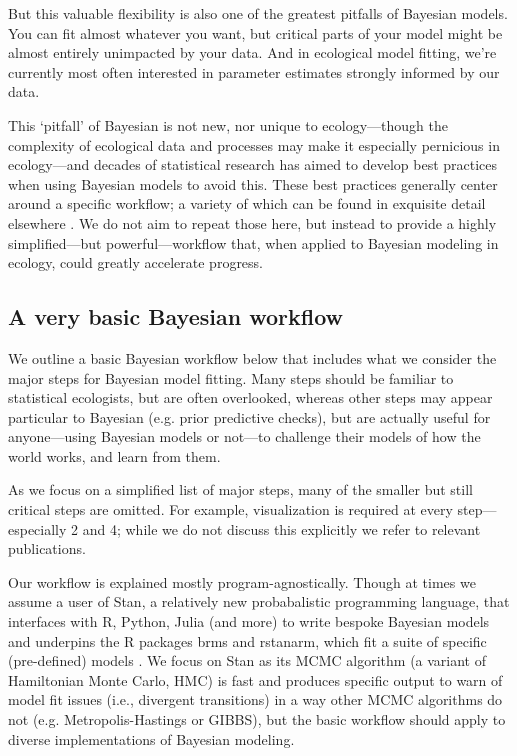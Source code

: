\documentclass[11pt]{article}
\begin{document}
But this valuable flexibility is also one of the greatest pitfalls of Bayesian models. You can fit almost whatever you want, but critical parts of your model might be almost entirely unimpacted by your data. And in ecological model fitting, we're currently most often interested in parameter estimates strongly informed by our data. 

This `pitfall' of Bayesian is not new, nor unique to ecology---though the complexity of ecological data and processes may make it especially pernicious in ecology---and decades of statistical research has aimed to develop best practices when using Bayesian models to avoid this. These best practices generally center around a specific workflow; a variety of which can be found in exquisite detail elsewhere \citep{betanworkflow,grinsztajn2021,vandeschoot2021}. We do not aim to repeat those here, but instead to provide a highly simplified---but powerful---workflow that, when applied to Bayesian modeling in ecology, could greatly accelerate progress. %

\subsection{A very basic Bayesian workflow}

We outline a basic Bayesian workflow below that includes what we consider the major steps for Bayesian model fitting. Many steps should be familiar to statistical ecologists, but are often overlooked, whereas other steps may appear particular to Bayesian (e.g. prior predictive checks), but are actually useful for anyone---using Bayesian models or not---to challenge their models of how the world works, and learn from them. 

As we focus on a simplified list of major steps, many of the smaller but still critical steps are omitted. For example, visualization is required at every step---especially 2 and 4; while we do not discuss this explicitly we refer to relevant publications.

Our workflow is explained mostly program-agnostically. Though at times we assume a user of \textsf{Stan}, a relatively new probabalistic programming language, that interfaces with \textsf{R, Python, Julia} (and more) to write bespoke Bayesian models and underpins the \textsf{R} packages \textsf{brms} and \textsf{rstanarm}, which fit a suite of specific (pre-defined) models \citep{Carpenter:2017stan}. We focus on \textsf{Stan} as its MCMC algorithm (a variant of Hamiltonian Monte Carlo, HMC) is fast and produces specific output to warn of model fit issues (i.e., divergent transitions) in a way other MCMC algorithms do not (e.g. Metropolis-Hastings or GIBBS), but the basic workflow should apply to diverse implementations of Bayesian modeling. \\
\end{document}
